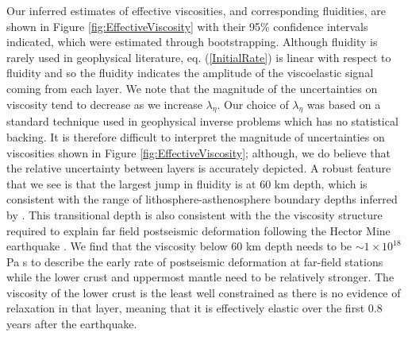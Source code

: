 \documentclass[review]{elsarticle}
\begin{document}
Our inferred estimates of effective viscosities, and corresponding fluidities, are shown in Figure \ref{fig:EffectiveViscosity} with their 95\% confidence intervals indicated, which were estimated through bootstrapping. Although fluidity is rarely used in geophysical literature, eq. (\ref{InitialRate}) is linear with respect to fluidity and so the fluidity indicates the amplitude of the viscoelastic signal coming from each layer.  We note that the magnitude of the uncertainties on viscosity tend to decrease as we increase $\lambda_\eta$. Our choice of $\lambda_\eta$ was based on a standard technique used in geophysical inverse problems which has no statistical backing.  It is therefore difficult to interpret the magnitude of uncertainties on viscosities shown in Figure \ref{fig:EffectiveViscosity}; although, we do believe that the relative uncertainty between layers is accurately depicted. A robust feature that we see is that the largest jump in fluidity is at 60 km depth, which is consistent with the range of lithosphere-asthenosphere boundary depths inferred by \citet{Lekic2011}. This transitional depth is also consistent with the the viscosity structure required to explain far field postseismic deformation following the Hector Mine earthquake \citep{Freed2007a}. We find that the viscosity below 60 km depth needs to be $\sim1\times10^{18}$ Pa s to describe the early rate of postseismic deformation at far-field stations while the lower crust and uppermost mantle need to be relatively stronger.  The viscosity of the lower crust is the least well constrained as there is no evidence of relaxation in that layer, meaning that it is effectively elastic over the first 0.8 years after the earthquake.  
\end{document}
